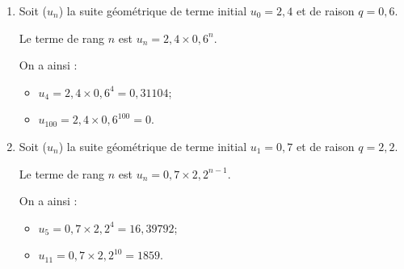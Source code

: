 \begin{myexs}
	\begin{enumerate}
		\item 	Soit ($u_n$) la suite géométrique de terme initial $u_0 = 2,4$ et de raison $q = 0,6$.
		
		Le terme de rang $n$ est $u_n = 2,4 \times 0,6^n$.
		
		On a ainsi : 
		\begin{itemize}
			\item $u_4 = 2,4 \times 0,6^4 = 0,31104$;
			\item $u_{100} = 2,4 \times 0,6^{100} = 0$.
		\end{itemize}
		
		\item Soit ($u_n$) la suite géométrique de terme initial $u_1 = 0,7$ et de raison $q = 2,2$.
		
		Le terme de rang $n$ est $u_n = 0,7 \times 2,2^{n-1}$.
		
		On a ainsi : 
		\begin{itemize}
			\item $u_5 = 0,7 \times 2,2^{4}= 16,39792$;
			\item $u_{11} = 0,7 \times 2,2^{10} = 1859$.
		\end{itemize}
	\end{enumerate}
	
	
	
\end{myexs}